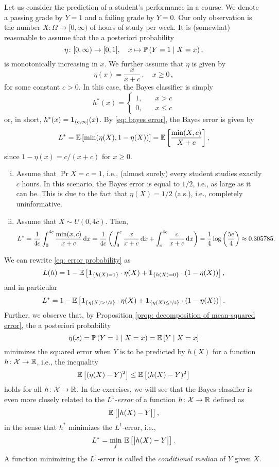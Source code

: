 \begin{example}
Let us consider the prediction of a student's performance in a course. We denote a passing grade by $Y=1$ and a failing grade by $Y=0$. Our only observation is the number $X \colon \Omega \to [0, \infty)$ of hours of study per week. It is (somewhat) reasonable to assume that the a posteriori probability
\[
    \eta \colon [0, \infty) \to [0, 1], \quad x \mapsto \mathbb{P}\left(Y = 1 \mathrel{|} X = x\right),
\]
is monotonically increasing in $x$. We further assume that $\eta$ is given by
\[
    \eta(x) = \frac{x}{x + c} \, , \quad x \geq 0 \, ,
\]
for some constant $c > 0$. In this case, the Bayes classifier is simply
\[
    h^*(x) = \begin{cases}
        1, \quad &x > c \\
        0, \quad &x \leq c
    \end{cases}
\]
or, in short, $h^*(x) = \mathbf{1}_{(c, \infty]}(x)$. By \eqref{eq: bayes error}, the Bayes error is given by
\[
    L^* = \mathbb{E}\left[\min(\eta(X), 1-\eta(X))\right] = \mathbb{E}\left[\frac{\min(X, c)}{X + c}\right],
\]
since $1 - \eta(x) = c / (x+c)$ for $x \geq 0$.

\begin{enumerate}[(i)]
    \item Assume that $\Pr{X = c} = 1$, i.e., (almost surely) every student studies exactly $c$ hours. In this scenario, the Bayes error is equal to $1/2$, i.e., as large as it can be. This is due to the fact that $\eta(X) = 1/2$ (a.s.), i.e., completely uninformative.
    
    \item Assume that $X \sim U(0, 4c)$. Then,
    \[
        L^* = \frac{1}{4c} \int_0^{4c} \frac{\min(x, c)}{x + c} \,\mathrm{d}x = \frac{1}{4c} \left( \int_0^c \frac{x}{x + c} \,\mathrm{d}x + \int_c^{4c} \frac{c}{x + c} \,\mathrm{d}x \right) = \frac{1}{4} \log\left(\frac{5\mathrm{e}}{4}\right) \approx 0.305785.
    \]
\end{enumerate}
\end{example}

\begin{remark}
We can rewrite \eqref{eq: error probability} as
\[
    L(h) = 1 - \mathbb{E}\left[\mathbf{1}_{\left\{h(X) = 1\right\}} \cdot \eta(X) + \mathbf{1}_{\left\{h(X) = 0\right\}} \cdot (1 - \eta(X))\right],
\]
and in particular
\[
    L^* = 1 - \mathbb{E}\left[\mathbf{1}_{\left\{\eta(X) > \nicefrac{1}{2}\right\}} \cdot \eta(X) + \mathbf{1}_{\left\{\eta(X) \leq \nicefrac{1}{2}\right\}} \cdot (1 - \eta(X))\right].
\]
Further, we observe that, by Proposition \ref{prop: decomposition of mean-squared error}, the a posteriori probability
\[
    \eta(x) = \mathbb{P}\left(Y=1 \mathrel{|} X=x\right) = \mathbb{E}\left[Y \mathrel{|} X=x\right]
\]
minimizes the squared error when $Y$ is to be predicted by $h(X)$ for a function $h \colon \mathcal{X} \to \mathbb{R}$, i.e., the inequality
\[
    \mathbb{E}\left[(\eta(X) - Y)^2\right] \leq \mathbb{E}\left[(h(X) - Y)^2\right]
\]
holds for all $h \colon \mathcal{X} \to \mathbb{R}$. In the exercises, we will see that the Bayes classifier is even more closely related to the \emph{$L^1$-error} of a function $h \colon \mathcal{X} \to \mathbb{R}$ defined as
\[
    \mathbb{E}\left[\big\lvert h(X) - Y \big\rvert\right],
\]
in the sense that $h^*$ minimizes the $L^1$-error, i.e.,
\[
    L^* = \min_f \, \mathbb{E}\left[\big\lvert h(X) - Y \big\rvert\right].
\]
A function minimizing the $L^1$-error is called the \emph{conditional median} of $Y$ given $X$.
\end{remark}

